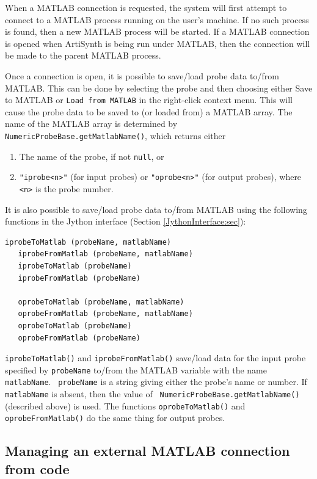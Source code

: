 \documentclass{article}
\begin{document}
\begin{sideblock}
When a MATLAB connection is requested, the system will first attempt
to connect to a MATLAB process running on the user's machine. If no
such process is found, then a new MATLAB process will be started.  If
a MATLAB connection is opened when ArtiSynth is being run under
MATLAB, then the connection will be made to the parent MATLAB process.
\end{sideblock}

Once a connection is open, it is possible to save/load probe data
to/from MATLAB. This can be done by selecting the probe and then
choosing either {\sf Save to MATLAB} or {\tt Load from MATLAB} in the
right-click context menu. This will cause the probe data to be saved
to (or loaded from) a MATLAB array. The name of the MATLAB array is
determined by {\tt NumericProbeBase.getMatlabName()}, which returns
either

\begin{enumerate}

\item The name of the probe, if not {\tt null}, or

\item {\tt "iprobe<n>"} (for input probes) or {\tt "oprobe<n>"} (for
output probes), where {\tt <n>} is the probe number.

\end{enumerate}

It is also possible to save/load probe data to/from MATLAB using the
following functions in the Jython interface (Section
\ref{JythonInterface:sec}):
%
\begin{lstlisting}[]
   iprobeToMatlab (probeName, matlabName)
   iprobeFromMatlab (probeName, matlabName)
   iprobeToMatlab (probeName)
   iprobeFromMatlab (probeName)

   oprobeToMatlab (probeName, matlabName)
   oprobeFromMatlab (probeName, matlabName)
   oprobeToMatlab (probeName)
   oprobeFromMatlab (probeName)
\end{lstlisting}
%
{\tt iprobeToMatlab()} and {\tt iprobeFromMatlab()}
save/load data for the input probe specified by {\tt probeName}
to/from the MATLAB variable with the name {\tt matlabName}. {\tt
probeName} is a string giving either the probe's name or number.  If
{\tt matlabName} is absent, then the value of {\tt
NumericProbeBase.getMatlabName()} (described above) is used.  The
functions {\tt oprobeToMatlab()} and {\tt oprobeFromMatlab()} do the
same thing for output probes.

\subsection{Managing an external MATLAB connection from code}
\label{MatlabFromCode:sec}
\end{document}
